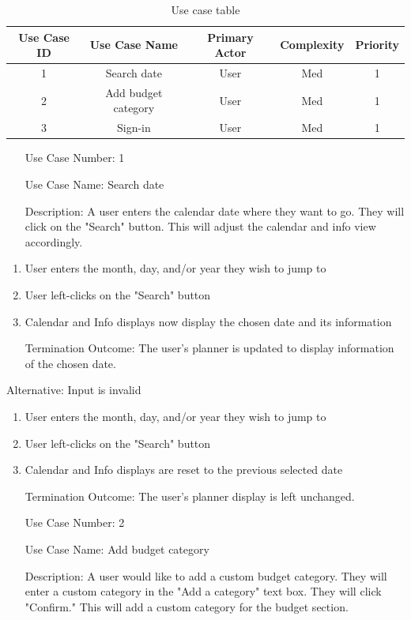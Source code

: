 \documentclass[10pt,conference,onecolumn,compsoc]{IEEEtran}
\begin{document}
\begin{table}
\centering
\begin{tabular}{|c|c|c|c|c|}
\hline
Use Case ID & Use Case Name & Primary Actor & Complexity & Priority \\
\hline \hline
1 & Search date & User & Med & 1\\
\hline
2 & Add budget category & User & Med & 1\\
\hline
3 & Sign-in & User & Med & 1\\
\hline

\end{tabular}
\caption{Use case table}
\label{tab:useCaseIndex}
\end{table}

\begin{itemize}
\item[Use Case Number:] 1
\item[Use Case Name:] Search date
\item[Description:] A user enters the calendar date where they want to go. They will click on the "Search" button. This will adjust the calendar and info view accordingly.
\end{itemize}

\begin{enumerate}
\item User enters the month, day, and/or year they wish to jump to
\item User left-clicks on the "Search" button
\item Calendar and Info displays now display the chosen date and its information
\item[Termination Outcome:] The user's planner is updated to display information of the chosen date.
\end{enumerate}

Alternative: Input is invalid
\begin{enumerate}
\item User enters the month, day, and/or year they wish to jump to
\item User left-clicks on the "Search" button
\item Calendar and Info displays are reset to the previous selected date
\item[Termination Outcome:] The user's planner display is left unchanged.
\end{enumerate}

\begin{itemize}
\item[Use Case Number:] 2
\item[Use Case Name:] Add budget category
\item[Description:] A user would like to add a custom budget category. They will enter a custom category in the "Add a category" text box. They will click "Confirm." This will add a custom category for the budget section.
\end{itemize}
\end{document}
